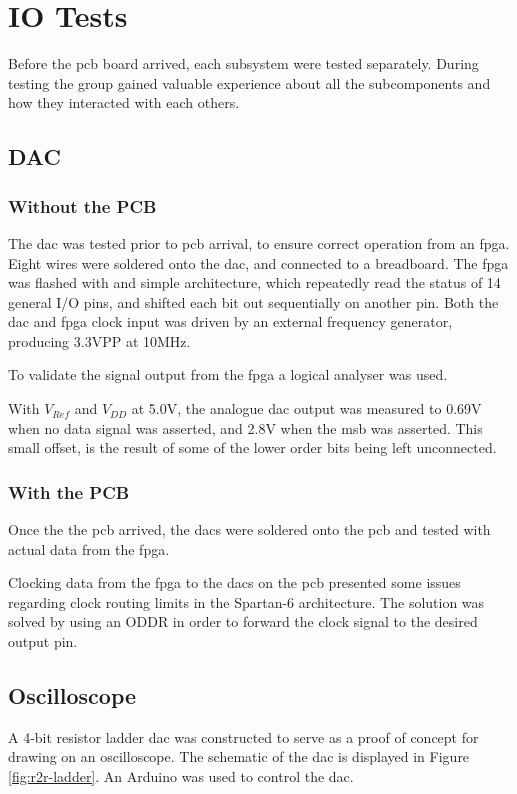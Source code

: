 \section{IO Tests}
Before the \gls{pcb} board arrived, each subsystem were tested separately.
During testing the group gained valuable experience about all the subcomponents and how they interacted with each others.

\subsection{DAC}

\subsubsection{Without the PCB}

The \gls{dac} was tested prior to \gls{pcb} arrival, to ensure correct operation from an \gls{fpga}.
Eight wires were soldered onto the \gls{dac}, and connected to a breadboard.
The \gls{fpga} was flashed with and simple architecture, which repeatedly read the status of 14 general I/O pins, and shifted each bit out sequentially on another pin.
Both the \gls{dac} and \gls{fpga} clock input was driven by an external frequency generator, producing 3.3VPP at 10MHz.

To validate the signal output from the \gls{fpga} a logical analyser was used.

With \(V_{Ref}\) and \(V_{DD}\) at 5.0V, the analogue \gls{dac} output was measured to 0.69V when no data signal was asserted, and 2.8V when the \gls{msb} was asserted. This small offset, is the result of some of the lower order bits being left unconnected.

\subsubsection{With the PCB}

Once the the \gls{pcb} arrived, the \gls{dac}s were soldered onto the \gls{pcb} and tested with actual data from the \gls{fpga}.

Clocking data from the \gls{fpga} to the \gls{dac}s on the \gls{pcb} presented some issues regarding clock routing limits in the Spartan-6 architecture.
The solution was solved by using an ODDR \cite[pp. 61--65]{fpga-io} in order to forward the clock signal to the desired output pin.


\subsection{Oscilloscope}
A 4-bit resistor ladder \gls{dac} was constructed to serve as a proof of concept for drawing on an oscilloscope.
The schematic of the \gls{dac} is displayed in Figure \ref{fig:r2r-ladder}.
An Arduino was used to control the \gls{dac}.


